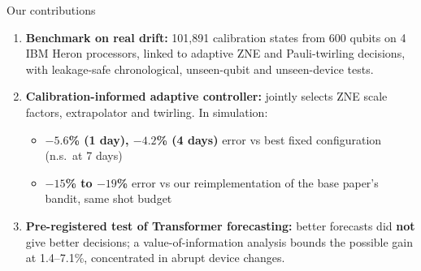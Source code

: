 \documentclass[aspectratio=169,11pt]{beamer}
\newcommand{\good}[1]{\textcolor{qgreen}{\textbf{#1}}}
\newcommand{\bad}[1]{\textcolor{qred}{\textbf{#1}}}
\begin{document}
\begin{frame}{Our contributions}
\begin{enumerate}
\item \textbf{Benchmark on real drift:} 101,891 calibration states from 600 qubits on 4 IBM Heron processors, linked to adaptive ZNE and Pauli-twirling decisions, with leakage-safe chronological, unseen-qubit and unseen-device tests.
\vspace{0.25cm}
\item \textbf{Calibration-informed adaptive controller:} jointly selects ZNE scale factors, extrapolator and twirling. In simulation:
\begin{itemize}
\item \good{$-5.6$\% (1 day), $-4.2$\% (4 days)} error vs best fixed configuration (n.s.\ at 7 days)
\item \good{$-15$\% to $-19$\%} error vs our reimplementation of the base paper's bandit, same shot budget
\end{itemize}
\vspace{0.25cm}
\item \textbf{Pre-registered test of Transformer forecasting:} better forecasts did \bad{not} give better decisions; a value-of-information analysis bounds the possible gain at 1.4--7.1\%, concentrated in abrupt device changes.
\end{enumerate}
\end{frame}
\end{document}

